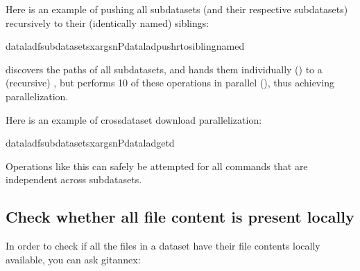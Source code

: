 \sphinxAtStartPar
Here is an example of pushing all subdatasets (and their respective subdatasets)
recursively to their (identically named) siblings:

\begin{sphinxVerbatim}[commandchars=\\\{\}]
datalad\PYGZhy{}fsubdatasetsxargs\PYGZhy{}n\PYGZhy{}Pdataladpush\PYGZhy{}r\PYGZhy{}\PYGZhy{}to\PYGZlt{}sibling\PYGZhy{}name\PYGZgt{}\PYGZhy{}d
\end{sphinxVerbatim}

\sphinxAtStartPar
{} discovers the paths of all subdatasets,
and  hands them individually () to a (recursive) ,
but performs 10 of these operations in parallel (), thus achieving
parallelization.

\sphinxAtStartPar
Here is an example of cross\sphinxhyphen{}dataset download parallelization:

\begin{sphinxVerbatim}[commandchars=\\\{\}]
datalad\PYGZhy{}fsubdatasetsxargs\PYGZhy{}n\PYGZhy{}Pdataladget\PYGZhy{}d
\end{sphinxVerbatim}

\sphinxAtStartPar
Operations like this can safely be attempted for all commands that are independent
across subdatasets.


\subsection{Check whether all file content is present locally}
\label{\detokenize{basics/101-146-gists:check-whether-all-file-content-is-present-locally}}
\sphinxAtStartPar
In order to check if all the files in a dataset have their file contents locally
available, you can ask git\sphinxhyphen{}annex:

